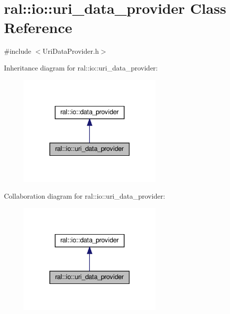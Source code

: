 \hypertarget{classral_1_1io_1_1uri__data__provider}{}\section{ral\+:\+:io\+:\+:uri\+\_\+data\+\_\+provider Class Reference}
\label{classral_1_1io_1_1uri__data__provider}


{\ttfamily \#include $<$Uri\+Data\+Provider.\+h$>$}



Inheritance diagram for ral\+:\+:io\+:\+:uri\+\_\+data\+\_\+provider\+:\nopagebreak
\begin{figure}[H]
\begin{center}
\leavevmode
\includegraphics[width=201pt]{classral_1_1io_1_1uri__data__provider__inherit__graph}
\end{center}
\end{figure}


Collaboration diagram for ral\+:\+:io\+:\+:uri\+\_\+data\+\_\+provider\+:\nopagebreak
\begin{figure}[H]
\begin{center}
\leavevmode
\includegraphics[width=201pt]{classral_1_1io_1_1uri__data__provider__coll__graph}
\end{center}
\end{figure}

